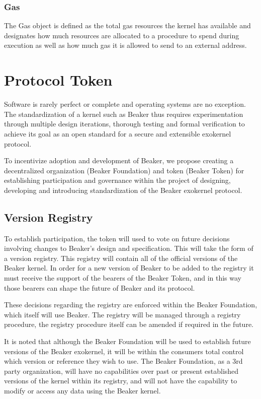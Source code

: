 \documentclass[english,a4paper]{article}
\let\oldparagraph\subsubsection
\renewcommand{\subsubsection}[1]{\oldparagraph{#1}\mbox{}}
\begin{document}
\subsubsection{Gas}\label{gas}

The Gas object is defined as the total gas resources the kernel has
available and designates how much resources are allocated to a procedure
to spend during execution as well as how much gas it is allowed to send
to an external address.

\section{Protocol Token}\label{protocol-token}

Software is rarely perfect or complete and operating systems are no
exception. The standardization of a kernel such as Beaker thus requires
experimentation through multiple design iterations, thorough testing and
formal verification to achieve its goal as an open standard for a secure
and extensible exokernel protocol.

To incentivize adoption and development of Beaker, we propose creating a
decentralized organization (Beaker Foundation) and token (Beaker Token)
for establishing participation and governance within the project of
designing, developing and introducing standardization of the Beaker
exokernel protocol.

\subsection{Version Registry}\label{version-registry}

To establish participation, the token will used to vote on future
decisions involving changes to Beaker's design and specification. This
will take the form of a version registry. This registry will contain all
of the official versions of the Beaker kernel. In order for a new
version of Beaker to be added to the registry it must receive the
support of the bearers of the Beaker Token, and in this way those
bearers can shape the future of Beaker and its protocol.

These decisions regarding the registry are enforced within the Beaker
Foundation, which itself will use Beaker. The registry will be managed
through a registry procedure, the registry procedure itself can be
amended if required in the future.

It is noted that although the Beaker Foundation will be used to
establish future versions of the Beaker exokernel, it will be within the
consumers total control which version or reference they wish to use. The
Beaker Foundation, as a 3rd party organization, will have no
capabilities over past or present established versions of the kernel
within its registry, and will not have the capability to modify or
access any data using the Beaker kernel.
\end{document}
